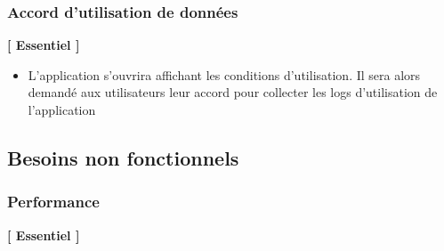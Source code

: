 \documentclass{article}
\begin{document}
		\subsubsection{Accord d'utilisation de données}
		\textbf{[ Essentiel ]}
		\begin{itemize}
			\item L'application s'ouvrira affichant les conditions d'utilisation. Il sera alors demandé aux utilisateurs leur accord pour collecter les logs d'utilisation de l'application
		\end{itemize}
		\newpage
		\subsection{Besoins non fonctionnels}
		\subsubsection{Performance} \label{performance}
		\textbf{[ Essentiel ]}
\end{document}
